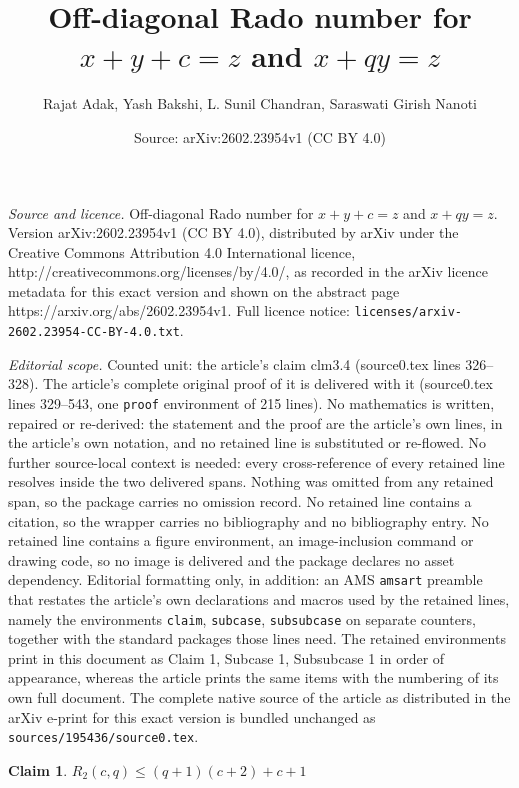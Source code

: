 \documentclass[10pt,a4paper]{amsart}
\title{Off-diagonal Rado number for $x+y+c=z$ and $x+qy=z$}
\author{Rajat Adak, Yash Bakshi, L. Sunil Chandran, Saraswati Girish Nanoti}
\date{Source: arXiv:2602.23954v1 (CC BY 4.0)}
\newtheorem{claim}{Claim}
\begin{document}
\maketitle

\noindent\emph{Source and licence.} Off-diagonal Rado number for $x+y+c=z$ and $x+qy=z$. Version arXiv:2602.23954v1 (CC BY 4.0), distributed by arXiv under the Creative Commons Attribution 4.0 International licence, http://creativecommons.org/licenses/by/4.0/, as recorded in the arXiv licence metadata for this exact version and shown on the abstract page https://arxiv.org/abs/2602.23954v1. Full licence notice: \texttt{licenses/arxiv-2602.23954-CC-BY-4.0.txt}.\par\smallskip

\noindent\textit{Editorial scope.} Counted unit: the article's claim clm3.4 (source0.tex lines 326--328). The article's complete original proof of it is delivered with it (source0.tex lines 329--543, one \texttt{proof} environment of 215 lines). No mathematics is written, repaired or re-derived: the statement and the proof are the article's own lines, in the article's own notation, and no retained line is substituted or re-flowed.  No further source-local context is needed: every cross-reference of every retained line resolves inside the two delivered spans.  Nothing was omitted from any retained span, so the package carries no omission record.  No retained line contains a citation, so the wrapper carries no bibliography and no bibliography entry.  No retained line contains a figure environment, an image-inclusion command or drawing code, so no image is delivered and the package declares no asset dependency.  Editorial formatting only, in addition: an AMS \texttt{amsart} preamble that restates the article's own declarations and macros used by the retained lines, namely the environments \texttt{claim}, \texttt{subcase}, \texttt{subsubcase} on separate counters, together with the standard packages those lines need.  The retained environments print in this document as Claim 1, Subcase 1, Subsubcase 1 in order of appearance, whereas the article prints the same items with the numbering of its own full document.  The complete native source of the article as distributed in the arXiv e-print for this exact version is bundled unchanged as \texttt{sources/195436/source0.tex}.
\begin{claim}\label{clm3.4}
    $R_2(c,q) \leq (q+1)(c+2) + c +1$
\end{claim}
\end{document}
